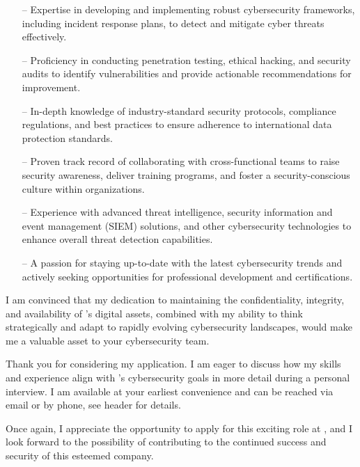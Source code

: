 \documentclass[11pt, a4paper]{awesome-cv}
\begin{document}
\begin{cvletter}
\begin{itemize}
  \item[--] Expertise in developing and implementing robust cybersecurity frameworks, including incident response plans, to detect and mitigate cyber threats effectively.
  \item[--] Proficiency in conducting penetration testing, ethical hacking, and security audits to identify vulnerabilities and provide actionable recommendations for improvement.
  \item[--] In-depth knowledge of industry-standard security protocols, compliance regulations, and best practices to ensure adherence to international data protection standards.
  \item[--] Proven track record of collaborating with cross-functional teams to raise security awareness, deliver training programs, and foster a security-conscious culture within organizations.
  \item[--] Experience with advanced threat intelligence, security information and event management (SIEM) solutions, and other cybersecurity technologies to enhance overall threat detection capabilities.
  \item[--] A passion for staying up-to-date with the latest cybersecurity trends and actively seeking opportunities for professional development and certifications.
\end{itemize}
I am convinced that my dedication to maintaining the confidentiality, integrity, and availability of 's digital assets, combined with my ability to think strategically and adapt to rapidly evolving cybersecurity landscapes, would make me a valuable asset to your cybersecurity team.

Thank you for considering my application. I am eager to discuss how my skills and experience align with 's cybersecurity goals in more detail during a personal interview. I am available at your earliest convenience and can be reached via email or by phone, see header for details.

Once again, I appreciate the opportunity to apply for this exciting role at , and I look forward to the possibility of contributing to the continued success and security of this esteemed  company.

\end{cvletter}


\makeletterclosing
\end{document}
